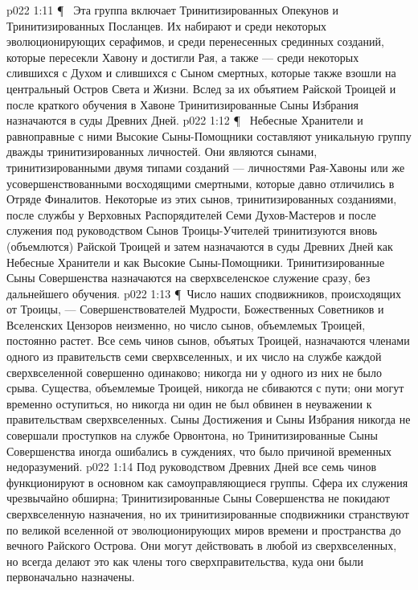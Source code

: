\vs p022 1:11 \P\  Эта группа включает Тринитизированных Опекунов и Тринитизированных Посланцев. Их набирают и среди некоторых эволюционирующих серафимов, и среди перенесенных срединных созданий, которые пересекли Хавону и достигли Рая, а также --- среди некоторых слившихся с Духом и слившихся с Сыном смертных, которые также взошли на центральный Остров Света и Жизни. Вслед за их объятием Райской Троицей и после краткого обучения в Хавоне Тринитизированные Сыны Избрания назначаются в суды Древних Дней.
\vs p022 1:12 \P\  Небесные Хранители и равноправные с ними Высокие Сыны\hyp{}Помощники составляют уникальную группу дважды тринитизированных личностей. Они являются сынами, тринитизированными двумя типами созданий --- личностями Рая\hyp{}Хавоны или же усовершенствованными восходящими смертными, которые давно отличились в Отряде Финалитов. Некоторые из этих сынов, тринитизированных созданиями, после службы у Верховных Распорядителей Семи Духов\hyp{}Мастеров и после служения под руководством Сынов Троицы\hyp{}Учителей тринитизуются вновь (объемлются) Райской Троицей и затем назначаются в суды Древних Дней как Небесные Хранители и как Высокие Сыны\hyp{}Помощники. Тринитизированные Сыны Совершенства назначаются на сверхвселенское служение сразу, без дальнейшего обучения.
\vs p022 1:13 \P\ Число наших сподвижников, происходящих от Троицы, --- Совершенствователей Мудрости, Божественных Советников и Вселенских Цензоров неизменно, но число сынов, объемлемых Троицей, постоянно растет. Все семь чинов сынов, объятых Троицей, назначаются членами одного из правительств семи сверхвселенных, и их число на службе каждой сверхвселенной совершенно одинаково; никогда ни у одного из них не было срыва. Существа, объемлемые Троицей, никогда не сбиваются с пути; они могут временно оступиться, но никогда ни один не был обвинен в неуважении к правительствам сверхвселенных. Сыны Достижения и Сыны Избрания никогда не совершали проступков на службе Орвонтона, но Тринитизированные Сыны Совершенства иногда ошибались в суждениях, что было причиной временных недоразумений.
\vs p022 1:14 Под руководством Древних Дней все семь чинов функционируют в основном как самоуправляющиеся группы. Сфера их служения чрезвычайно обширна; Тринитизированные Сыны Совершенства не покидают сверхвселенную назначения, но их тринитизированные сподвижники странствуют по великой вселенной от эволюционирующих миров времени и пространства до вечного Райского Острова. Они могут действовать в любой из сверхвселенных, но всегда делают это как члены того сверхправительства, куда они были первоначально назначены.
